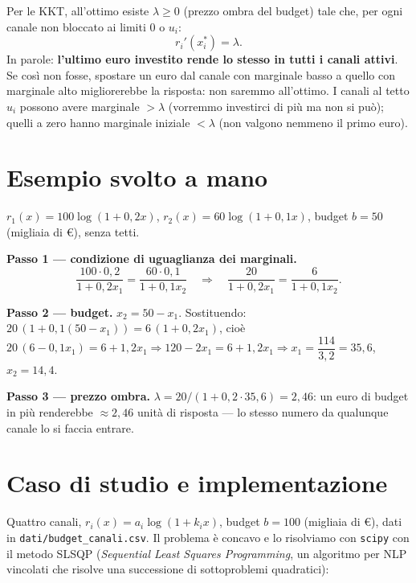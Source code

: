 \begin{spiegazione}
Per le KKT, all'ottimo esiste $\lambda \ge 0$ (prezzo ombra del budget) tale che, per
ogni canale non bloccato ai limiti $0$ o $u_i$:
\[
r_i'(x_i^*) = \lambda .
\]
In parole: \textbf{l'ultimo euro investito rende lo stesso in tutti i canali attivi}.
Se così non fosse, spostare un euro dal canale con marginale basso a quello con
marginale alto migliorerebbe la risposta: non saremmo all'ottimo. I canali al tetto
$u_i$ possono avere marginale $> \lambda$ (vorremmo investirci di più ma non si può);
quelli a zero hanno marginale iniziale $< \lambda$ (non valgono nemmeno il primo euro).
\end{spiegazione}

\section{Esempio svolto a mano}

\begin{esempio}
$r_1(x) = 100\log(1 + 0{,}2x)$, $r_2(x) = 60\log(1 + 0{,}1x)$, budget $b = 50$
(migliaia di \euro), senza tetti.

\textbf{Passo 1 — condizione di uguaglianza dei marginali.}
\[
\frac{100 \cdot 0{,}2}{1 + 0{,}2x_1} = \frac{60 \cdot 0{,}1}{1 + 0{,}1x_2}
\quad\Longrightarrow\quad
\frac{20}{1 + 0{,}2x_1} = \frac{6}{1 + 0{,}1x_2}.
\]

\textbf{Passo 2 — budget.} $x_2 = 50 - x_1$. Sostituendo:
$20\,(1 + 0{,}1(50 - x_1)) = 6\,(1 + 0{,}2 x_1)$, cioè
$20\,(6 - 0{,}1x_1) = 6 + 1{,}2x_1 \Rightarrow 120 - 2x_1 = 6 + 1{,}2x_1
\Rightarrow x_1 = \dfrac{114}{3{,}2} = 35{,}6$, $x_2 = 14{,}4$.

\textbf{Passo 3 — prezzo ombra.} $\lambda = 20/(1 + 0{,}2 \cdot 35{,}6) = 2{,}46$:
un euro di budget in più renderebbe $\approx 2{,}46$ unità di risposta ---
lo stesso numero da qualunque canale lo si faccia entrare.
\end{esempio}

\section{Caso di studio e implementazione}

Quattro canali, $r_i(x) = a_i\log(1 + k_i x)$, budget $b = 100$ (migliaia di \euro), dati in
\texttt{dati/budget\_canali.csv}. Il problema è concavo e lo risolviamo con
\texttt{scipy} con il metodo SLSQP (\emph{Sequential Least Squares Programming},
un algoritmo per NLP vincolati che risolve una successione di sottoproblemi
quadratici):

